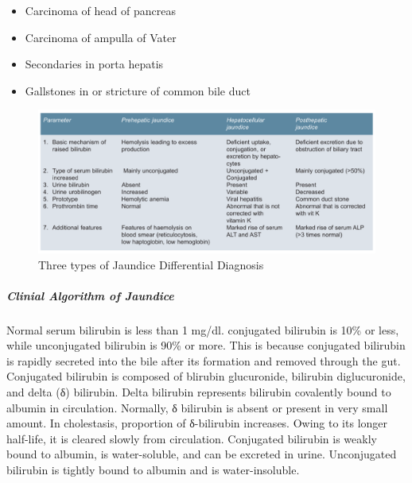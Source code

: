\documentclass[
  letterpaper,
  DIV=11,
  numbers=noendperiod]{scrreprt}
\let\oldsubparagraph\subparagraph
\renewcommand{\subparagraph}[1]{\oldsubparagraph{#1}\mbox{}}
\providecommand{\tightlist}{%
  \setlength{\itemsep}{0pt}\setlength{\parskip}{0pt}}\usepackage{longtable,booktabs,array}
\begin{document}
\begin{itemize}
\tightlist
\item
  Carcinoma of head of pancreas
\item
  Carcinoma of ampulla of Vater
\item
  Secondaries in porta hepatis
\item
  Gallstones in or stricture of common bile duct
\end{itemize}

\begin{figure}

{\centering \includegraphics{image/Types_jaundice.png}

}

\caption{Three types of Jaundice Differential Diagnosis}

\end{figure}%

\subparagraph{Clinial Algorithm of
Jaundice}\label{clinial-algorithm-of-jaundice}

Normal serum bilirubin is less than 1 mg/dl. conjugated bilirubin is
10\% or less, while unconjugated bilirubin is 90\% or more. This is
because conjugated bilirubin is rapidly secreted into the bile after its
formation and removed through the gut. Conjugated bilirubin is composed
of blirubin glucuronide, bilirubin diglucuronide, and delta (δ)
bilirubin. Delta bilirubin represents bilirubin covalently bound to
albumin in circulation. Normally, δ bilirubin is absent or present in
very small amount. In cholestasis, proportion of δ-bilirubin increases.
Owing to its longer half-life, it is cleared slowly from circulation.
Conjugated bilirubin is weakly bound to albumin, is water-soluble, and
can be excreted in urine. Unconjugated bilirubin is tightly bound to
albumin and is water-insoluble.
\end{document}
